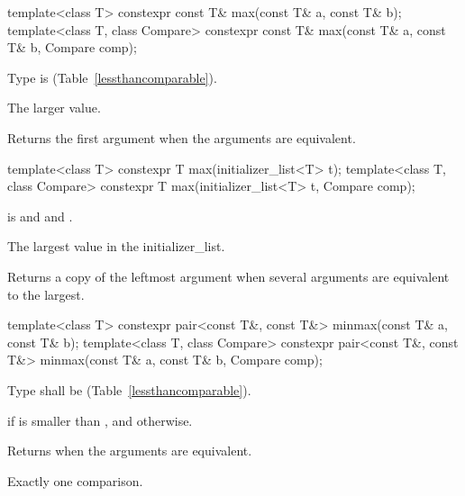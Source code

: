 %
\begin{itemdecl}
template<class T> constexpr const T& max(const T& a, const T& b);
template<class T, class Compare>
  constexpr const T& max(const T& a, const T& b, Compare comp);
\end{itemdecl}

\begin{itemdescr}
\pnum
\requires
Type
is
 (Table~\ref{lessthancomparable}).

\pnum
\returns
The larger value.

\pnum
\notes
Returns the first argument when the arguments are equivalent.
\end{itemdescr}

%
\begin{itemdecl}
template<class T>
  constexpr T max(initializer_list<T> t);
template<class T, class Compare>
  constexpr T max(initializer_list<T> t, Compare comp);
\end{itemdecl}

\begin{itemdescr}
\pnum
\requires {} is  and  and .

\pnum
\returns The largest value in the initializer_list.

\pnum
\remarks Returns a copy of the leftmost argument when several arguments are equivalent to the largest.
\end{itemdescr}

%
\begin{itemdecl}
template<class T> constexpr pair<const T&, const T&> minmax(const T& a, const T& b);
template<class T, class Compare>
  constexpr pair<const T&, const T&> minmax(const T& a, const T& b, Compare comp);
\end{itemdecl}


\begin{itemdescr}
\pnum
\requires
Type
shall be
 (Table~\ref{lessthancomparable}).

\pnum
\returns
{} if  is smaller
than , and
 otherwise.

\pnum
\notes
Returns  when the arguments are equivalent.

\pnum
\complexity
Exactly one comparison.
\end{itemdescr}


